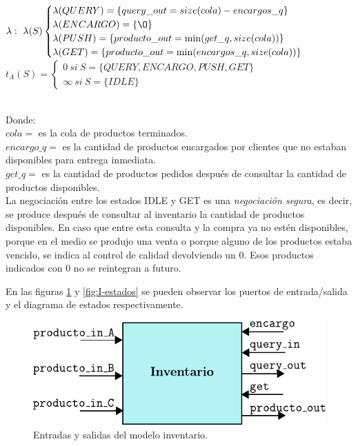 \documentclass[10pt]{article}
\begin{document}
{\begin{minipage}{0.9\textwidth}
		$\lambda:~\lambda(S)\begin{cases}
		\lambda(QUERY)=\{query\_out = size(cola) - encargos\_q\}\\
		\lambda(ENCARGO)=\{\O\}\\
		\lambda(PUSH)=\{producto\_out = \min(get\_q,size(cola))\}\\
		\lambda(GET)=\{producto\_out = \min(encargos\_q,size(cola))\}\\
		\end{cases}$\\
		
		$t_A(S)=\begin{cases}
		0~si~S=\{QUERY,ENCARGO,PUSH,GET\}\\
		\infty~si~S=\{IDLE\}
		\end{cases}$
	\end{minipage}
}\\

Donde:\\
$cola = $ es la cola de productos terminados.\\ 
$encargo\_q = $ es la cantidad de productos encargados por clientes que no estaban disponibles para entrega inmediata.\\
$get\_q = $ es la cantidad de productos pedidos después de consultar la cantidad de productos disponibles.\\

La negociación entre los estados IDLE y GET es una \textit{negociación segura}, es decir, se produce después de consultar al inventario la cantidad de productos disponibles. En caso que entre esta consulta y la compra ya no estén disponibles, porque en el medio se produjo una venta o porque alguno de los productos estaba vencido, se indica al control de calidad devolviendo un $0$. Esos productos indicados con $0$ no se reintegran a futuro.

En las figuras \ref{fig:I-esquematico} y \ref{fig:I-estados} se pueden observar los puertos de entrada/salida y el diagrama de estados respectivamente.

\begin{figure}[htbp]
	\centering
	\includegraphics{img/I-esquematico}
	\caption{Entradas y salidas del modelo inventario.}
	\label{fig:I-esquematico}
\end{figure}
\end{document}
